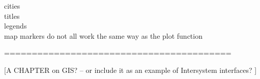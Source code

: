 cities\\
titles\\
legends\\
map markers do not all work the same way as the plot function



=========================================

[A CHAPTER on GIS?  -- or include it as an example of Intersystem interfaces? ]





